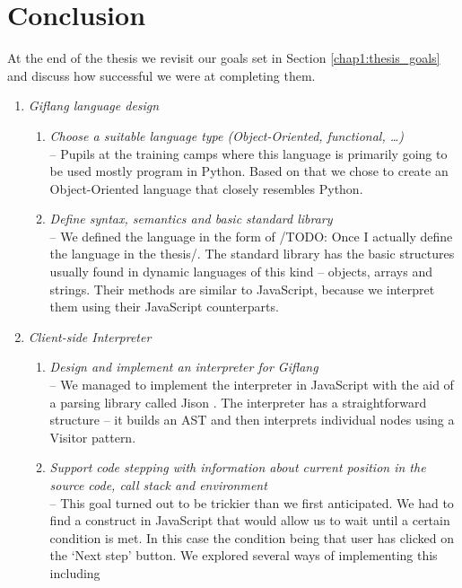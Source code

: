 \chapter*{Conclusion}
At the end of the thesis we revisit our goals set in Section \ref{chap1:thesis_goals} and discuss how successful we were at completing them.

\begin{enumerate}
\item \textit{Giflang language design} 
   \begin{enumerate}[label=(\alph*)]
     \item \textit{Choose a suitable language type (Object-Oriented, functional, \ldots)} \\
     -- Pupils at the training camps where this language is primarily going to be used mostly program in Python. Based on that we chose to create an
     Object-Oriented language that closely resembles Python.
     \item \textit{Define syntax, semantics and basic standard library} \\
     -- We defined the language in the form of /TODO: Once I actually define the language in the thesis/. The standard library has the basic structures usually
     found in dynamic languages of this kind -- objects, arrays and strings. Their methods are similar to JavaScript, because we interpret them using their JavaScript
     counterparts.
   \end{enumerate}
\item \textit{Client-side Interpreter}
   \begin{enumerate}[label=(\alph*)]
	 \item \textit{Design and implement an interpreter for Giflang} \\
     -- We managed to implement the interpreter in JavaScript with the aid of a parsing library called Jison \cite{Jison}. The interpreter
     has a straightforward structure -- it builds an AST and then interprets individual nodes using a Visitor pattern.
     \item \textit{Support code stepping with information about current position in the source code, call stack and environment} \\
     -- This goal turned out to be trickier than we first anticipated. We had to find a construct in JavaScript that would allow us to wait until a certain
     condition is met. In this case the condition being that user has clicked on the `Next step' button. We explored several ways of implementing this including

\end{enumerate}
\end{enumerate}
